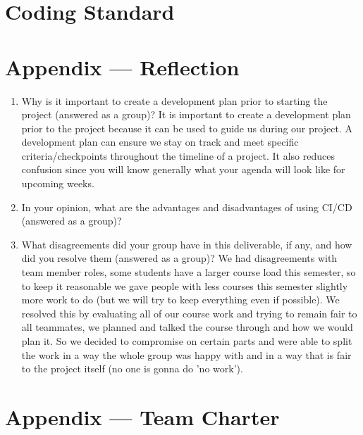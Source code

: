 \documentclass{article}
\begin{document}
\section{Coding Standard}


\newpage{}

\section*{Appendix --- Reflection}



\begin{enumerate}
    \item Why is it important to create a development plan prior to starting the
    project (answered as a group)?
        It is important to create a development plan prior to the project 
    because it can be used to guide us during our project. A development plan can ensure
    we stay on track and meet specific criteria/checkpoints throughout the timeline 
    of a project. It also reduces confusion since you will know generally what your agenda 
    will look like for upcoming weeks. 
    \item In your opinion, what are the advantages and disadvantages of using
    CI/CD (answered as a group)?
    \item What disagreements did your group have in this deliverable, if any,
    and how did you resolve them (answered as a group)?
    We had disagreements with team member roles, some students have a larger
    course load this semester, so to keep it reasonable we gave people with less courses this 
    semester slightly more work to do (but we will try to keep everything even if possible). We resolved 
    this by evaluating all of our course work and trying to remain fair to all teammates, we planned and talked 
    the course through and how we would plan it. So we decided to compromise on certain parts and were able to split
    the work in a way the whole group was happy with and in a way that is fair to the project itself (no one is gonna do 'no work').
\end{enumerate}

\newpage{}

\section*{Appendix --- Team Charter}
\end{document}
